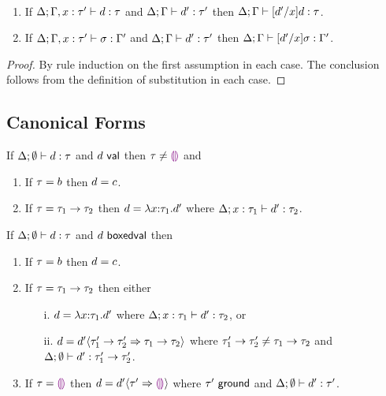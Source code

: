 \vspace{5pt}
\begin{lem}[Substitution] \label{thm:substitution}~
\begin{enumerate}[nolistsep]
\item If $\Delta; \Gamma, x : \tau' \vdash d : \tau$ and $\Delta; \Gamma \vdash d' : \tau'$ then $\Delta; \Gamma \vdash [d'/x]d : \tau$.
\item If $\Delta; \Gamma, x : \tau' \vdash \sigma : \Gamma'$ and $\Delta; \Gamma \vdash d' : \tau'$ then $\Delta; \Gamma \vdash [d'/x]\sigma : \Gamma'$.
\end{enumerate}
\end{lem}
\begin{proof} By rule induction on the first assumption in each case. The conclusion follows from the definition of substitution in each case. \end{proof}

\subsection{Canonical Forms} 
\begin{lem}\label{thm:canonincal-value-forms}
  If $\Delta; \emptyset \vdash d : \tau$ and $d~\mathsf{val}$
  then $\tau\neq\textcolor{violet}{\llparenthesis}\textcolor{violet}{\rrparenthesis}$ and
  \begin{enumerate}[nolistsep]
    \item If $\tau=b$ then $d=c$.
    \item If $\tau=\tau_1 \rightarrow \tau_2$
          then $d=\lambda x{:}\tau_1.d'$
          where $\Delta; x : \tau_1 \vdash d' : \tau_2$.
  \end{enumerate}
\end{lem}

\begin{lem}\label{thm:canonical-boxed-forms}
  If $\Delta; \emptyset \vdash d : \tau$ and $d~\mathsf{boxedval}$
  then
  \begin{enumerate}[nolistsep]
    \item If $\tau=b$ then $d=c$.
    \item If $\tau=\tau_1 \rightarrow \tau_2$ then either
      \begin{enumerate}
        \item[i.]
          $d=\lambda x{:}\tau_1.d'$
          where $\Delta; x : \tau_1 \vdash d' : \tau_2$, or
        \item[ii.]
          $d=d' \langle{\tau_1' \rightarrow \tau_2'}\Rightarrow{\tau_1 \rightarrow \tau_2}\rangle$
          where $\tau_1' \rightarrow \tau_2'\neq\tau_1 \rightarrow \tau_2$
          and $\Delta; \emptyset \vdash d' : \tau_1' \rightarrow \tau_2'$.
      \end{enumerate}
    \item If $\tau=\textcolor{violet}{\llparenthesis}\textcolor{violet}{\rrparenthesis}$
          then $d=d' \langle{\tau'}\Rightarrow{\textcolor{violet}{\llparenthesis}\textcolor{violet}{\rrparenthesis}}\rangle$
          where $\tau'~\mathsf{ground}$
          and $\Delta; \emptyset \vdash d' : \tau'$.
  \end{enumerate}
\end{lem}

